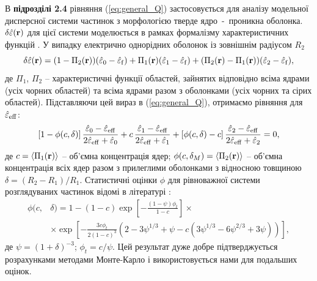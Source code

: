 \documentclass[twoside,a4paper,14pt]{vakaref}
\begin{document}
В {\bf підрозділі 2.4} рівняння (\ref{eq:general_Q}) застосовується для аналізу модельної дисперсної системи частинок з морфологією тверде ядро~-~проникна оболонка. $\delta\hat{\varepsilon}({\bf r})$ для цієї системи моделюється в рамках формалізму характеристичних функцій \cite{Torquato}. У випадку електрично однорідних оболонок із зовнішнім радіусом $R_2$
\begin{equation}\label{eq:delta-eps-1layer}
\delta\hat{\varepsilon} ({\bf r}) = (1 - \Pi_2 ({\bf r})) (\hat{\varepsilon}_0 - \hat{\varepsilon}_{\rm f})
+ \Pi_1 ({\bf r}) (\hat{\varepsilon}_1 - \hat{\varepsilon}_{\rm f})
+ (\Pi_2 ({\bf r}) - \Pi_1 ({\bf r})) (\hat{\varepsilon}_2 - \hat{\varepsilon}_{\rm f}),
\end{equation}
де $\Pi_1$, $\Pi_2$ -- характеристичні функції областей, зайнятих відповідно всіма ядрами (усіх чорних областей) та всіма ядрами разом з оболонками (усіх чорних та сірих областей). Підставляючи цей вираз в (\ref{eq:general_Q}), отримаємо рівняння для $\hat{\varepsilon}_{\rm eff}$:
\begin{equation}\label{eq:general_uniformshell}
	\left[1-\phi(c, \delta)\right]\frac{\hat{\varepsilon}_0
		-\hat{\varepsilon}_{\rm eff}}{2\hat{\varepsilon}_{\rm
			eff}+\hat{\varepsilon}_0} + c\,\frac{\hat{\varepsilon}_1
		-\hat{\varepsilon}_{\rm eff}}{2\hat{\varepsilon}_{\rm
			eff}+\hat{\varepsilon}_1}
	+\left[\phi(c, \delta)-c\right]\frac{\hat{\varepsilon}_2
		-\hat{\varepsilon}_{\rm eff}}{2\hat{\varepsilon}_{\rm
			eff}+\hat{\varepsilon}_2}=0,
\end{equation}
де $c = \langle \Pi_1 ({\bf r}) \rangle$ -- об'ємна концентрація ядер; $\phi(c,\delta_M) = \langle \Pi_2 ({\bf r}) \rangle$ -- об'ємна концентрація всіх ядер разом з прилеглими оболонками з відносною товщиною $\delta = (R_2 - R_1)/R_1$. Статистичні оцінки $\phi$ для рівноважної системи розглядуваних частинок відомі в літературі \cite{RikvoldP.1985}:
\begin{equation}\label{eq:phi_pen}
\begin{split}
\phi(c,&\delta) = 1 - (1-c)\exp{\left[ -\frac{(1-\psi)\phi_t}{1-c} \right]} \times \\
&\times\exp{\left[ -\frac{3c\phi_t}{2(1-c)^3} \left( 2 - 3
	\psi^{1/3} + \psi - c \left( 3\psi^{1/3} - 6\psi^{2/3} +3\psi
	\right) \right) \right]},
\end{split}
\end{equation}
де $\psi = (1+\delta)^{-3}$; $\phi_t = c/\psi$.
Цей результат дуже добре підтверджується розрахунками методами Монте-Карло \cite{Rotter2003} і використовується нами для подальших оцінок. 
\end{document}
